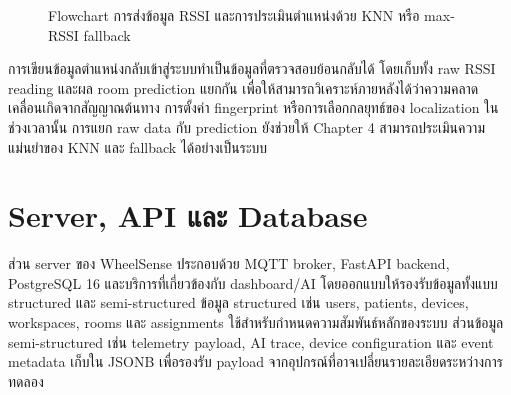 \begin{figure}[!htbp]
    \centering
    \caption{Flowchart การส่งข้อมูล RSSI และการประเมินตำแหน่งด้วย KNN หรือ max-RSSI fallback}
    \label{fig:ch3-localization-flow}
\end{figure}

การเขียนข้อมูลตำแหน่งกลับเข้าสู่ระบบทำเป็นข้อมูลที่ตรวจสอบย้อนกลับได้ โดยเก็บทั้ง raw RSSI reading และผล room prediction แยกกัน เพื่อให้สามารถวิเคราะห์ภายหลังได้ว่าความคลาดเคลื่อนเกิดจากสัญญาณต้นทาง การตั้งค่า fingerprint หรือการเลือกกลยุทธ์ของ localization ในช่วงเวลานั้น การแยก raw data กับ prediction ยังช่วยให้ Chapter 4 สามารถประเมินความแม่นยำของ KNN และ fallback ได้อย่างเป็นระบบ

\section{Server, API และ Database}
\label{sec:ch3_server}
ส่วน server ของ WheelSense ประกอบด้วย MQTT broker, FastAPI backend, PostgreSQL 16 และบริการที่เกี่ยวข้องกับ dashboard/AI โดยออกแบบให้รองรับข้อมูลทั้งแบบ structured และ semi-structured ข้อมูล structured เช่น users, patients, devices, workspaces, rooms และ assignments ใช้สำหรับกำหนดความสัมพันธ์หลักของระบบ ส่วนข้อมูล semi-structured เช่น telemetry payload, AI trace, device configuration และ event metadata เก็บใน JSONB เพื่อรองรับ payload จากอุปกรณ์ที่อาจเปลี่ยนรายละเอียดระหว่างการทดลอง

